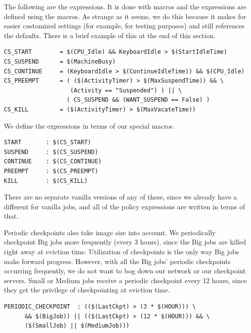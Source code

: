 The following are the expressions.
It is done with macros and the expressions are defined using
the macros.
As strange as it seems,
we do this because it makes for easier
customized settings (for example, for testing purposes)
and still references the defaults.
There is a brief example of this at the end of this section.
\begin{verbatim}
CS_START        = $(CPU_Idle) && KeyboardIdle > $(StartIdleTime)
CS_SUSPEND      = $(MachineBusy)
CS_CONTINUE     = (KeyboardIdle > $(ContinueIdleTime)) && $(CPU_Idle)
CS_PREEMPT      = ( ($(ActivityTimer) > $(MaxSuspendTime)) && \
                   (Activity == "Suspended") ) || \
                  ( CS_SUSPEND && (WANT_SUSPEND == False) )
CS_KILL         = ($(ActivityTimer) > $(MaxVacateTime))
\end{verbatim}

We define the expressions in terms of our special macros.
\begin{verbatim}
START       : $(CS_START)
SUSPEND     : $(CS_SUSPEND)
CONTINUE    : $(CS_CONTINUE)
PREEMPT     : $(CS_PREEMPT)
KILL        : $(CS_KILL)
\end{verbatim}

There are no
separate vanilla versions of any of
these, since we already have a different  for
vanilla jobs, and all of the policy expressions are written in
terms of that.

Periodic checkpoints also take image size into account.  
We periodically checkpoint Big jobs more frequently (every 3 hours),
since the Big jobs are killed right away at eviction time.
Utilization of checkpoints is the only way Big jobs make forward progress.
However, with all the Big jobs' periodic checkpoints occurring
frequently, we do not want to bog down our network or our checkpoint
servers.
Small or Medium jobs receive a periodic checkpoint
every 12 hours,
since they get the privilege of checkpointing at eviction time.
\begin{verbatim}
PERIODIC_CHECKPOINT  : (($(LastCkpt) > (3 * $(HOUR))) \
      && $(BigJob)) || (($(LastCkpt) > (12 * $(HOUR))) && \
      ($(SmallJob) || $(MediumJob)))
\end{verbatim}

